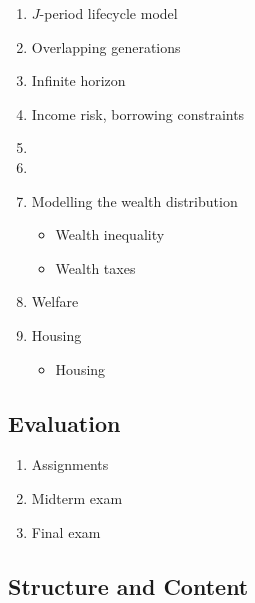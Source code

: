 \documentclass[a4paper,12pt]{article}
\begin{document}
\begin{enumerate}
\item $J$-period lifecycle model
\item Overlapping generations
\item Infinite horizon
\item Income risk, borrowing constraints
\item 
\item 
\item Modelling the wealth distribution
\begin{itemize}
  \item Wealth inequality
  \item Wealth taxes
\end{itemize} 
\item Welfare
\item Housing
\begin{itemize}
  \item Housing 
\end{itemize}
\end{enumerate}

\subsection*{Evaluation}

\begin{enumerate}
\item Assignments
\item Midterm exam
\item Final exam
\end{enumerate}

\subsection*{Structure and Content}
\end{document}
